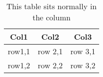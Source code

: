 
\begin{table}
\begin{tabular}{ccc}
	\toprule
	\textbf{Col1} & \textbf{Col2} & \textbf{Col3} \\
	\midrule
	row1,1 & row 2,1 & row 3,1 \\
	row1,2 & row 2,2 & row 3,2 \\
	\bottomrule
\end{tabular}
\caption{This table sits normally in the column}
\label{tab:example-table}	
\end{table}

